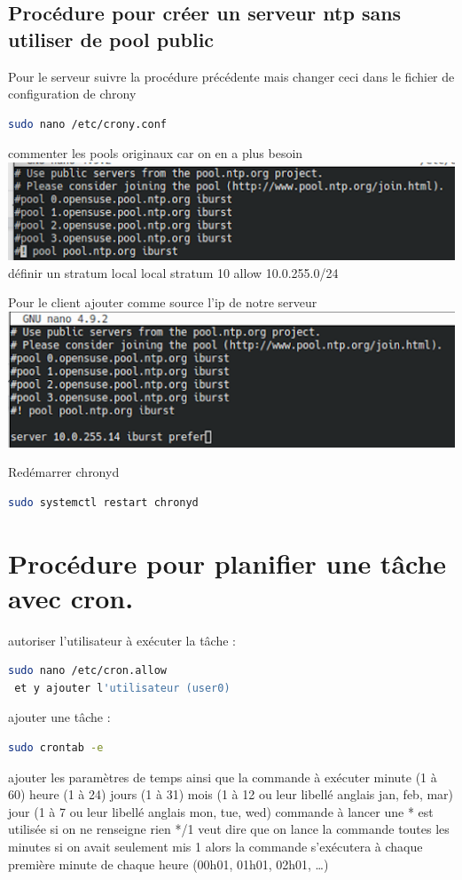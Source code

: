 \documentclass[a4paper]{article}
\begin{document}
\begin{adjustwidth}{-2cm}{-2cm}
 \newpage
\subsection {Procédure pour créer un serveur ntp sans utiliser de pool public}
\noindent Pour le serveur suivre la procédure précédente mais changer ceci dans le fichier de configuration de chrony
\begin{lstlisting}[language=bash]
 sudo nano /etc/crony.conf
\end{lstlisting}
commenter les pools originaux car on en a plus besoin \newline
\includegraphics[scale=0.8]{picture/10.png} \newline
définir un stratum local
local stratum 10
allow 10.0.255.0/24

Pour le client ajouter comme source l’ip de notre serveur \newline
\includegraphics[scale=0.8]{picture/11.png} \newline

\noindent Redémarrer chronyd
\begin{lstlisting}[language=bash]
 sudo systemctl restart chronyd
\end{lstlisting}

 \newpage
\section {Procédure pour planifier une tâche avec cron.}
\noindent autoriser l'utilisateur à exécuter la tâche :
\begin{lstlisting}[language=bash]
 sudo nano /etc/cron.allow
 et y ajouter l'utilisateur (user0)
\end{lstlisting}

\noindent ajouter une tâche :
\begin{lstlisting}[language=bash]
 sudo crontab -e
\end{lstlisting}
ajouter les paramètres de temps ainsi que la commande à exécuter 
minute (1 à 60)
heure (1 à 24)
jours (1 à 31)
mois (1 à 12 ou leur libellé anglais jan, feb, mar)
jour (1 à 7 ou leur libellé anglais mon, tue, wed)
commande à lancer
une * est utilisée si on ne renseigne rien
*/1 veut dire que on lance la commande toutes les minutes si on avait seulement mis 1 alors la commande s'exécutera à chaque première minute de chaque heure (00h01, 01h01, 02h01, …)


\end{adjustwidth}
\end{document}

